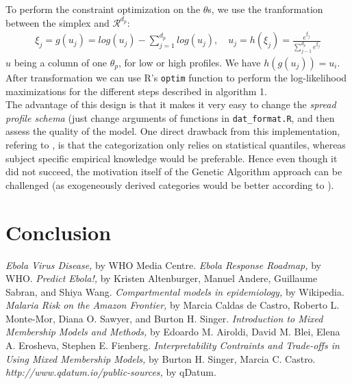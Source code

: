 \documentclass[twoside]{article}
\begin{document}
To perform the constraint optimization on the $\theta$s, we use the tranformation between the simplex and $\mathcal{R}^{d_p}$:
\begin{align*}
\xi_j = g(u_j) = log(u_j) - \sum_{j=1}^{d_p} log(u_j), \quad u_j = h(\xi_j) = \frac{e^{\xi_j}}{\sum_{j-1}^{d_p} e^{\xi_j}}
\end{align*}
$u$ being a column of one $\theta_p$, for low or high profiles. We have $h(g(u_j)) = u_i$. After transformation we can use R's \texttt{optim} function to perform the log-likelihood maximizations for the different steps described in algorithm 1.\\

The advantage of this design is that it makes it very easy to change the \textit{spread profile schema} (just change arguments of functions in \texttt{dat\_format.R}, and then assess the quality of the model. One direct drawback from this implementation, refering to \cite{mixmemint}, is that the categorization only relies on statistical quantiles, whereas subject specific empirical knowledge would be preferable. Hence even though it did not succeed, the motivation itself of the Genetic Algorithm approach can be challenged (as exogeneously derived categories would be better according to \cite{mixmemint}).


\section{Conclusion}



\clearpage
\begin{thebibliography}{9}
 \emph{Ebola Virus Disease,}
 by WHO Media Centre. 
 \emph{Ebola Response Roadmap,} by 
	 WHO.
 \emph{Predict Ebola!,} by 
	 Kristen Altenburger, Manuel Andere, Guillaume Sabran, and Shiya Wang.
 \emph{Compartmental models in epidemiology,} by 
	 Wikipedia. 
	\emph{Malaria Risk on the Amazon Frontier,} by Marcia Caldas de Castro, Roberto L. Monte-Mor, Diana O. Sawyer, and Burton H. Singer.
  \emph{Introduction to Mixed Membership Models and Methods,} by Edoardo M. Airoldi, David M. Blei, Elena A. Erosheva, Stephen E. Fienberg.
  \emph{Interpretability Contraints and Trade-offs in Using Mixed Membership Models,} by Burton H. Singer, Marcia C. Castro.
  \emph{http://www.qdatum.io/public-sources,} by qDatum.

\end{thebibliography}
\end{document}
